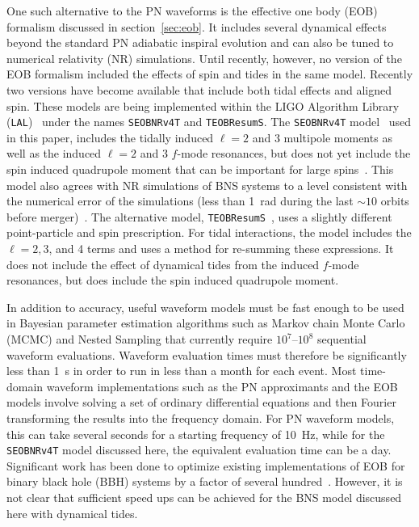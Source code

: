\documentclass[prd,aps,letter,twocolumn,floatfix,notitlepage,nofootinbib]{revtex4-1}
\begin{document}
One such alternative to the PN waveforms is the effective one body (EOB) formalism discussed in section~\ref{sec:eob}. It includes several dynamical effects beyond the standard PN adiabatic inspiral evolution and can also be tuned to numerical relativity (NR) simulations. Until recently, however, no version of the EOB formalism included the effects of spin and tides in the same model. Recently two versions have become available that include both tidal effects and aligned spin. These models are being implemented within the LIGO Algorithm Library (\texttt{LAL})~\cite{lal} under the names \texttt{SEOBNRv4T} and \texttt{TEOBResumS}. The \texttt{SEOBNRv4T} model~\cite{Hinderer:2016eia,Steinhoff:2016rfi} used in this paper, includes the tidally induced $\ell=2$ and 3  multipole moments as well as the induced $\ell=2$ and 3 $f$-mode resonances, but does not yet include the spin induced quadrupole moment that can be important for large spins~\cite{Poisson1998, HarryHinderer2017}. This model also agrees with NR simulations of BNS systems to a level consistent with the numerical error of the simulations (less than 1~rad during the last $\sim 10$ orbits before merger)~\cite{DietrichHinderer2017, KiuchiKawaguchiKyutoku2017}. The alternative model, \texttt{TEOBResumS}~\cite{Nagar2017}, uses a slightly different point-particle and spin prescription. For tidal interactions, the model includes the $\ell = 2, 3$, and 4 terms and uses a method for re-summing these expressions. It does not include the effect of dynamical tides from the induced $f$-mode resonances, but does include the spin induced quadrupole moment.


In addition to accuracy, useful waveform models must be fast enough to be used in Bayesian parameter estimation algorithms such as Markov chain Monte Carlo (MCMC) and Nested Sampling that currently require $10^7$--$10^8$ sequential waveform evaluations. Waveform evaluation times must therefore be significantly less than 1~s in order to run in less than a month for each event. Most time-domain waveform implementations such as the PN approximants and the EOB models involve solving a set of ordinary differential equations and then Fourier transforming the results into the frequency domain. For PN waveform models, this can take several seconds for a starting frequency of 10~Hz, while for the \texttt{SEOBNRv4T} model discussed here, the equivalent evaluation time can be a day. Significant work has been done to optimize existing implementations of EOB for binary black hole (BBH) systems by a factor of several hundred~\cite{DevineEtienneMcWilliams2016}. However, it is not clear that sufficient speed ups can be achieved for the BNS model discussed here with dynamical tides. 
\end{document}
